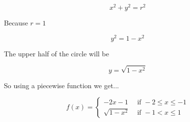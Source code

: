 \documentclass{article}
\begin{document}
\begin{enumerate}
		$$x^2 + y^2 = r^2$$

		Because $r = 1$

		$$y^2 = 1 - x^2$$

		The upper half of the circle will be

		$$y = \sqrt{1 - x^2}$$

		So using a piecewise function we get...

		$$f(x) = \begin{cases}
			-2x - 1 & \text{ if } -2 \leq x \leq -1 \\
			\sqrt{1 - x^2} & \text{ if } -1 < x \leq 1
		\end{cases}
		$$
\end{enumerate}
\end{document}
